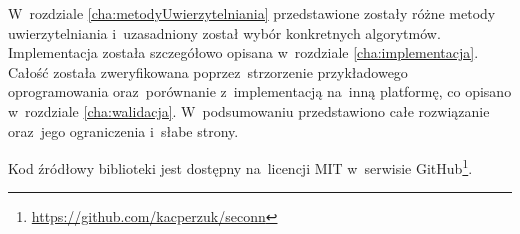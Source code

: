 W~rozdziale \ref{cha:metodyUwierzytelniania} przedstawione zostały różne metody uwierzytelniania i~uzasadniony został wybór konkretnych algorytmów. Implementacja została szczegółowo opisana w~rozdziale \ref{cha:implementacja}. Całość została zweryfikowana poprzez~strzorzenie przykładowego oprogramowania oraz~porównanie z~implementacją na~inną platformę, co opisano w~rozdziale \ref{cha:walidacja}. W~podsumowaniu przedstawiono całe rozwiązanie oraz~jego ograniczenia i~słabe strony.

Kod źródłowy biblioteki jest dostępny na~licencji MIT w~serwisie GitHub\footnote{\url{https://github.com/kacperzuk/seconn}}.
